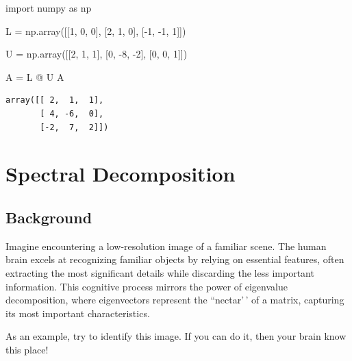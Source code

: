 \documentclass[
  letterpaper,
  DIV=11,
  numbers=noendperiod]{scrreprt}
\newenvironment{Shaded}{\begin{snugshade}}{\end{snugshade}}
\newcommand{\DecValTok}[1]{\textcolor[rgb]{0.68,0.00,0.00}{#1}}
\newcommand{\ImportTok}[1]{\textcolor[rgb]{0.00,0.46,0.62}{#1}}
\newcommand{\NormalTok}[1]{\textcolor[rgb]{0.00,0.23,0.31}{#1}}
\newcommand{\OperatorTok}[1]{\textcolor[rgb]{0.37,0.37,0.37}{#1}}
\theoremstyle{plain}
\theoremstyle{definition}
\theoremstyle{remark}
\begin{document}
\begin{Shaded}
\begin{Highlighting}[]
\ImportTok{import}\NormalTok{ numpy }\ImportTok{as}\NormalTok{ np}

\NormalTok{L }\OperatorTok{=}\NormalTok{ np.array([[}\DecValTok{1}\NormalTok{, }\DecValTok{0}\NormalTok{, }\DecValTok{0}\NormalTok{],}
\NormalTok{              [}\DecValTok{2}\NormalTok{, }\DecValTok{1}\NormalTok{, }\DecValTok{0}\NormalTok{],}
\NormalTok{              [}\OperatorTok{{-}}\DecValTok{1}\NormalTok{, }\OperatorTok{{-}}\DecValTok{1}\NormalTok{, }\DecValTok{1}\NormalTok{]])}

\NormalTok{U }\OperatorTok{=}\NormalTok{ np.array([[}\DecValTok{2}\NormalTok{, }\DecValTok{1}\NormalTok{, }\DecValTok{1}\NormalTok{],}
\NormalTok{              [}\DecValTok{0}\NormalTok{, }\OperatorTok{{-}}\DecValTok{8}\NormalTok{, }\OperatorTok{{-}}\DecValTok{2}\NormalTok{],}
\NormalTok{              [}\DecValTok{0}\NormalTok{, }\DecValTok{0}\NormalTok{, }\DecValTok{1}\NormalTok{]])}

\NormalTok{A }\OperatorTok{=}\NormalTok{ L }\OperatorTok{@}\NormalTok{ U}
\NormalTok{A}
\end{Highlighting}
\end{Shaded}

\begin{verbatim}
array([[ 2,  1,  1],
       [ 4, -6,  0],
       [-2,  7,  2]])
\end{verbatim}


\chapter{Spectral Decomposition}\label{spectral-decomposition}

\section{Background}\label{background}

Imagine encountering a low-resolution image of a familiar scene. The
human brain excels at recognizing familiar objects by relying on
essential features, often extracting the most significant details while
discarding the less important information. This cognitive process
mirrors the power of eigenvalue decomposition, where eigenvectors
represent the ``nectar'\,' of a matrix, capturing its most important
characteristics.

As an example, try to identify this image. If you can do it, then your
brain know this place!
\end{document}
